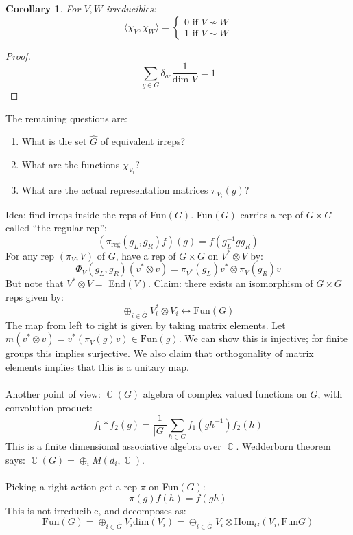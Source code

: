 \documentclass[12 pt]{article}
\DeclareMathOperator {\C} {\mathbb{C}}
\theoremstyle{plain}
\newtheorem{cor}[thm]{Corollary}
\theoremstyle{definition}
\theoremstyle{remark}
\begin{document}
\begin{cor}
For $V,W$ irreducibles:
\[      \langle \chi_V , \chi_W \rangle = \left\{ \begin{array} {c}  0 \text{   if } V\not \sim W \\ 1 \text{   if } V \sim W  \end{array} \right.  \]
\end{cor}
\begin{proof}
\[      \sum_{g\in G} \delta_{ac} \frac{1}{\text{dim }V} = 1       \]
\end{proof}
The remaining questions are:
\begin{enumerate}
\item What is the set $\hat G$ of equivalent irreps?
\item What are the functions $\chi_{V_i}$?
\item What are the actual representation matrices $\pi_{V_i} (g)$?
\end{enumerate}
Idea: find irreps inside the reps of Fun$(G)$. Fun$(G)$ carries a rep of $G\times G$ called ``the regular rep'':
\[     \left( \pi_{\text{reg}} (g_L, g_R) f \right)  (g) = f ( g_L^{-1} g g_R  )     \]
For any rep $(\pi_V, V)$ of $G$, have a rep of $G\times G$ on $V^* \otimes V$ by:
\[      \Phi_V  (g_L, g_R) (v^* \otimes v) = \pi_{V^*} (g_L) v^* \otimes \pi_V(g_R) v     \]
But note that $V^* \otimes V = $ End$(V)$. Claim: there exists an isomorphism of $G\times G$ reps given by:
\[          \oplus_{i \in \hat G} V_i^* \otimes V_i    \longleftrightarrow   \text{Fun}(G)       \]
The map from left to right is given by taking matrix elements. Let $m(v^*\otimes v) = v^* (\pi_V (g) v) \in \text{Fun}(g)$. We can show this is injective; for finite groups this implies surjective. We also claim that orthogonality of matrix elements implies that this is a unitary map.
\\
\\
Another point of view: $\C(G)$ algebra of complex valued functions on $G$, with convolution product:
\[   f_1 * f_2 (g) = \frac{1}{|G|} \sum_{h\in G} f_1 (gh^{-1}) f_2(h)   \]
This is a finite dimensional associative algebra over $\C$. Wedderborn theorem says: $\C(G) = \oplus_i M(d_i, \C)$.
\\
\\
Picking a right action get a rep $\pi$ on Fun$(G)$:
\[    \pi(g) f(h) = f(gh)     \]
This is not irreducible, and decomposes as:
\[      \text{Fun}(G) = \oplus_{i \in \hat G} V_i \text{dim}(V_i)  = \oplus  _{i \in \hat G} V_i\otimes \text{Hom}_G(V_i, \text{Fun}G) \]
\end{document}
